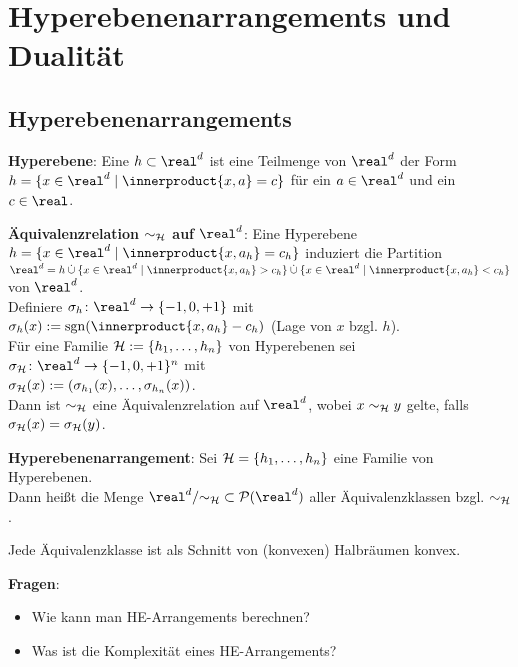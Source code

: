 \chapter{%
    Hyperebenenarrangements und Dualität%
}

\section{%
    Hyperebenenarrangements%
}

\textbf{Hyperebene}:
Eine  $h \subset \real^d$ ist eine Teilmenge von $\real^d$ der Form\\
$h = \{x \in \real^d \;|\; \innerproduct{x, a} = c\}$ für ein $a \in \real^d$ und ein $c \in \real$.

\textbf{Äquivalenzrelation $\sim_{\mathcal{H}}$ auf $\real^d$}:
Eine Hyperebene $h = \{x \in \real^d \;|\; \innerproduct{x, a_h} = c_h\}$ induziert die Partition
$\real^d = h \dcup \{x \in \real^d \;|\; \innerproduct{x, a_h} > c_h\} \dcup
\{x \in \real^d \;|\; \innerproduct{x, a_h} < c_h\}$ von $\real^d$.\\
Definiere $\sigma_h\colon \real^d \to \{-1, 0, +1\}$ mit
$\sigma_h(x) := \sgn(\innerproduct{x, a_h} - c_h)$ (Lage von $x$ bzgl. $h$).\\
Für eine Familie $\mathcal{H} := \{h_1, \dotsc, h_n\}$ von Hyperebenen sei
$\sigma_\H\colon \real^d \to \{-1, 0, +1\}^n$ mit\\
$\sigma_{\mathcal{H}}(x) := (\sigma_{h_1}(x), \dotsc, \sigma_{h_n}(x))$.\\
Dann ist $\sim_{\mathcal{H}}$ eine Äquivalenzrelation auf $\real^d$, wobei $x \sim_{\mathcal{H}} y$ gelte,
falls $\sigma_{\mathcal{H}}(x) = \sigma_{\mathcal{H}}(y)$.

\textbf{Hyperebenenarrangement}:
Sei $\mathcal{H} = \{h_1, \dotsc, h_n\}$ eine Familie von Hyperebenen.\\
Dann heißt die Menge $\real^d/{\sim_\H} \subset \P(\real^d)$ aller Äquivalenzklassen
bzgl. $\sim_{\mathcal{H}}$\\
.

Jede Äquivalenzklasse ist als Schnitt von (konvexen) Halbräumen konvex.

\textbf{Fragen}:
\begin{itemize}
    \item
    Wie kann man HE-Arrangements berechnen?

    \item
    Was ist die Komplexität eines HE-Arrangements?
\end{itemize}

